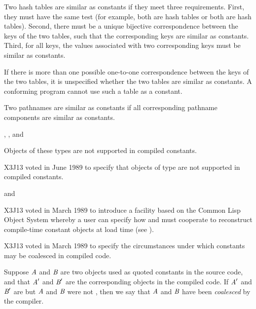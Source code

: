 \begin{flushdesc}
  Two hash tables are similar as constants if they meet
  three requirements.
  First, they must have the same test (for example, both are  hash tables
  or both are  hash tables).
  Second, there must be a unique bijective correspondence between the keys of
      the two tables, such that the corresponding keys are similar as
      constants.
  Third, for all keys, the values associated with two corresponding keys
      must be similar as constants.

  If there is more than one possible one-to-one correspondence between
  the keys of the two tables, it is unspecified whether the two
  tables are similar as constants.  A conforming
  program cannot use such a table as a constant.

\item[\cdf{pathname}]

  Two pathnames are similar as constants if all corresponding pathname
  components are similar as constants.

\item[\cdf{stream}, \cdf{readtable}, and \cdf{method}]

  Objects of these types are not supported in compiled constants.

\item[\cdf{function}]


   X3J13 voted in June 1989 
   to specify that objects of type 
   are not supported in compiled constants.

\item[\cdf{structure} and \cdf{standard-object}]

   X3J13 voted in March 1989  to introduce a facility
based on the Common Lisp Object System
whereby a user can specify how  and 
must cooperate to reconstruct compile-time constant objects at load time
(see ).
\end{flushdesc}

   X3J13 voted in March 1989  to specify
the circumstances under which constants may be coalesced in compiled code.

Suppose $\emph{A}$ and $\emph{B}$ are two
objects used as quoted constants in the source code, and that $\emph{A}'$ and
$\emph{B}'$ are the corresponding objects in the compiled code.  If $\emph{A}'$ and $\emph{B}'$
are  but $\emph{A}$ and $\emph{B}$ were not , then we say that $\emph{A}$ and $\emph{B}$ have been
\emph{coalesced} by the compiler.

